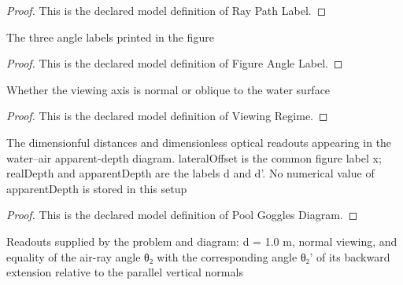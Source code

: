 \begin{proof}
  This is the declared model definition of Ray Path Label.
\end{proof}
\begin{definition}
  \label{def:physics:phyx-mini-0137:phyxminiproblems-problemphyxmini0137-figureanglelabel}
  The three angle labels printed in the figure
\end{definition}
\begin{proof}
  This is the declared model definition of Figure Angle Label.
\end{proof}
\begin{definition}
  \label{def:physics:phyx-mini-0137:phyxminiproblems-problemphyxmini0137-viewingregime}
  Whether the viewing axis is normal or oblique to the water surface
\end{definition}
\begin{proof}
  This is the declared model definition of Viewing Regime.
\end{proof}
\begin{definition}
  \label{def:physics:phyx-mini-0137:phyxminiproblems-problemphyxmini0137-poolgogglesdiagram}
  The dimensionful distances and dimensionless optical readouts appearing in the water--air apparent-depth diagram. lateralOffset is the common figure label x; realDepth and apparentDepth are the labels d and d'. No numerical value of apparentDepth is stored in this setup
\end{definition}
\begin{proof}
  This is the declared model definition of Pool Goggles Diagram.
\end{proof}
\begin{definition}
  \label{def:physics:phyx-mini-0137:phyxminiproblems-problemphyxmini0137-matchespoolgogglesfigure}
  Readouts supplied by the problem and diagram: d = 1.0 m, normal viewing, and equality of the air-ray angle θ₂ with the corresponding angle θ₂' of its backward extension relative to the parallel vertical normals
\end{definition}
